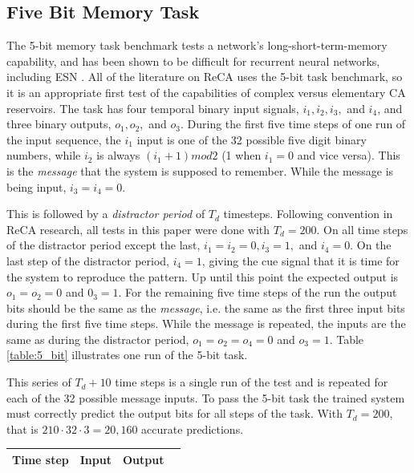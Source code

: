 \documentclass{elsarticle}
\begin{document}
\begin{multicols}{2}
\subsection{Five Bit Memory Task}\label{5_bit}
The 5-bit memory task benchmark tests a network's long-short-term-memory 
capability, and has been shown to be difficult for recurrent neural networks, 
    including ESN \cite{hochreiter1997long}\cite{jaeger2012long}. All of the 
    literature on ReCA uses the 5-bit task benchmark, so it is an appropriate 
    first test of the capabilities of complex versus elementary CA reservoirs.  
    The task has four temporal binary input signals, $i_1, i_2, i_3,$ and 
    $i_4$, and three binary outputs, $o_1, o_2,$ and $o_3$.  During the
first five time steps of one run of the input sequence, the $i_1$ input is one 
of the 32 possible five digit binary numbers, while $i_2$ is always $(i_1 + 1) 
    mod 2$ (1 when $i_1 = 0$ and vice versa). This is the \textit{message} that 
    the system is supposed to remember. While the message is being input, $i_3 
    = i_4 = 0$.  \par  This is followed by a \textit{distractor period} of 
    $T_d$ timesteps.  Following convention in ReCA research, all tests in this 
    paper were done with $T_d = 200$.  On all time steps of the distractor 
    period except the last, $i_1 = i_2 = 0, i_3 = 1, $ and $i_4 = 0$. On the 
    last step of the distractor period, $i_4 = 1$, giving the cue signal that 
    it is time for the system to reproduce the pattern. Up until this point the 
    expected output is $o_1 = o_2 = 0 $ and $0_3 = 1$. For the remaining five 
    time steps of the run the output bits should be the same as the 
    \textit{message}, i.e.  the same as the first three input bits during the 
    first five time steps.  While the message is repeated, the inputs are the 
    same as during the distractor period, $o_1 = o_2 = o_4 = 0$ and $o_3 = 1$.  
    Table \ref{table:5_bit} illustrates one run of the 5-bit task. \par
    This series of $T_d + 10$ time steps is a single run of the test and is 
    repeated for each of the 32 possible message inputs. To pass the 5-bit task 
    the trained system must correctly predict the output bits for all steps of 
    the task. With $T_d = 200$, that is $210 \cdot 32 \cdot 3 = 20,160$ accurate 
    predictions.

\begin{table}[t]  \centering
\small
\begin{tabular}{|c|l|l|l|l|l|l|l|l}
\cline{1-8}
\multicolumn{1}{|l|}{Time step} & \multicolumn{4}{l|}{Input} & \multicolumn{3}{l|}{Output} & \cellcolor[HTML]{FFFFFF}{\color[HTML]{333333} } \\ \hline
   

\end{tabular}
\end{table}
\end{multicols}
\end{document}
